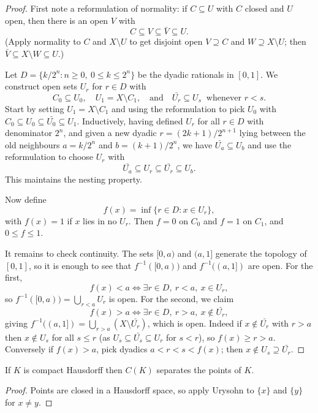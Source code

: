 \documentclass[a4paper]{scrartcl}
\begin{document}
\begin{proof}
	First note a reformulation of normality: if $C \subseteq U$ with $C$ closed and $U$ open, then there is an open $V$ with
	$$C \subseteq V \subseteq \bar V \subseteq U.$$
	(Apply normality to $C$ and $X \setminus U$ to get disjoint open $V \supseteq C$ and $W \supseteq X \setminus U$; then $\bar V \subseteq X \setminus W \subseteq U$.)

	Let $D = \{ k/2^n : n \geq 0, \ 0 \leq k \leq 2^n \}$ be the dyadic rationals in $[0,1]$. We construct open sets $U_r$ for $r \in D$ with
	$$C_0 \subseteq U_0, \quad U_1 = X \setminus C_1, \quad \text{and} \quad \bar{U_r} \subseteq U_s \ \text{ whenever } r < s.$$
	Start by setting $U_1 = X\setminus C_1$ and using the reformulation to pick $U_0$ with $C_0 \subseteq U_0 \subseteq \bar{U_0}\subseteq U_1$. Inductively, having defined $U_r$ for all $r \in D$ with denominator $2^n$, and given a new dyadic $r = (2k+1)/2^{n+1}$ lying between the old neighbours $a = k/2^n$ and $b = (k+1)/2^n$, we have $\bar{U_a} \subseteq U_b$ and use the reformulation to choose $U_r$ with
	$$\bar{U_a} \subseteq U_r \subseteq \bar{U_r} \subseteq U_b.$$
	This maintains the nesting property.

	Now define
	$$f(x) = \inf \{ r \in D : x \in U_r \},$$
	with $f(x) = 1$ if $x$ lies in no $U_r$. Then $f = 0$ on $C_0$ and $f = 1$ on $C_1$, and $0 \leq f \leq 1$.

	It remains to check continuity. The sets $[0,a)$ and $(a,1]$ generate the topology of $[0,1]$, so it is enough to see that $f^{-1}([0,a))$ and $f^{-1}((a,1])$ are open. For the first,
	$$f(x) < a \iff \exists r \in D, \ r < a, \ x \in U_r,$$
	so $f^{-1}([0,a)) = \bigcup_{r<a}U_r$ is open. For the second, we claim
	$$f(x) > a \iff \exists r \in D, \ r > a, \ x \notin \bar{U_r},$$
	giving $f^{-1}((a,1]) = \bigcup_{r > a}(X \setminus \bar{U_r})$, which is open. Indeed if $x \notin \bar{U_r}$ with $r > a$ then $x \notin U_s$ for all $s \leq r$ (as $U_s \subseteq \bar{U_s} \subseteq U_r$ for $s < r$), so $f(x) \geq r > a$. Conversely if $f(x) > a$, pick dyadics $a < r < s < f(x)$; then $x \notin U_s \supseteq \bar{U_r}$.
\end{proof}

\begin{corollary}
	If $K$ is compact Hausdorff then $C(K)$ separates the points of $K$.
\end{corollary}

\begin{proof}
	Points are closed in a Hausdorff space, so apply Urysohn to $\{x\}$ and $\{y\}$ for $x \neq y$.
\end{proof}
\end{document}
